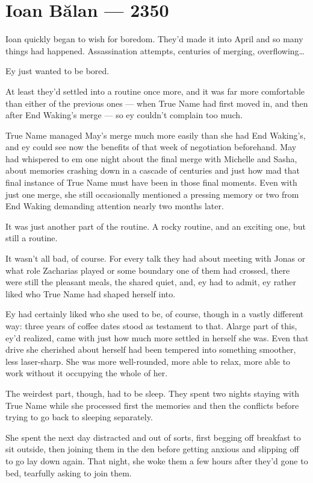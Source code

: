 \hypertarget{ioan-bux103lan-2350}{%
\chapter{Ioan Bălan — 2350}\label{ioan-bux103lan-2350}}

Ioan quickly began to wish for boredom. They'd made it into April and so many things had happened. Assassination attempts, centuries of merging, overflowing\ldots{}

Ey just wanted to be bored.

At least they'd settled into a routine once more, and it was far more comfortable than either of the previous ones — when True Name had first moved in, and then after End Waking's merge — so ey couldn't complain too much.

True Name managed May's merge much more easily than she had End Waking's, and ey could see now the benefits of that week of negotiation beforehand. May had whispered to em one night about the final merge with Michelle and Sasha, about memories crashing down in a cascade of centuries and just how mad that final instance of True Name must have been in those final moments. Even with just one merge, she still occasionally mentioned a pressing memory or two from End Waking demanding attention nearly two months later.

It was just another part of the routine. A rocky routine, and an exciting one, but still a routine.

It wasn't all bad, of course. For every talk they had about meeting with Jonas or what role Zacharias played or some boundary one of them had crossed, there were still the pleasant meals, the shared quiet, and, ey had to admit, ey rather liked who True Name had shaped herself into.

Ey had certainly liked who she used to be, of course, though in a vastly different way: three years of coffee dates stood as testament to that. Alarge part of this, ey'd realized, came with just how much more settled in herself she was. Even that drive she cherished about herself had been tempered into something smoother, less laser-sharp. She was more well-rounded, more able to relax, more able to work without it occupying the whole of her.

The weirdest part, though, had to be sleep. They spent two nights staying with True Name while she processed first the memories and then the conflicts before trying to go back to sleeping separately.

She spent the next day distracted and out of sorts, first begging off breakfast to sit outside, then joining them in the den before getting anxious and slipping off to go lay down again. That night, she woke them a few hours after they'd gone to bed, tearfully asking to join them.


